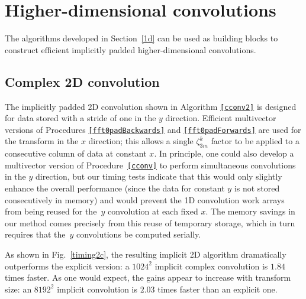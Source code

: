 \documentclass[final]{siamltex}
\begin{document}
\section{Higher-dimensional convolutions}\label{multid}
The algorithms developed in Section~\ref{1d} can be used as building
blocks to construct efficient implicitly padded higher-dimensional convolutions.
\subsection{Complex 2D convolution}
The implicitly padded 2D convolution shown in Algorithm {\tt\ref{cconv2}} 
is designed for data stored with a stride of one in the $y$
direction. Efficient multivector versions of Procedures {\tt\ref{fft0padBackwards}}
and {\tt\ref{fft0padForwards}} are used for the transform in the $x$ direction;
this allows a single $\zeta_{3m}^k$ factor to be applied to a consecutive
column of data at constant $x$. In principle, one could also develop a
multivector version of Procedure~{\tt\ref{cconv}} to perform simultaneous
convolutions in the $y$ direction, but our timing tests indicate that this
would only slightly enhance the overall performance (since the data for constant
$y$ is not stored consecutively in memory) and would prevent the 1D convolution
work arrays from being reused for the~$y$ convolution at each fixed $x$. The
memory savings in our method comes precisely from this reuse of temporary
storage, which in turn requires that the~$y$ convolutions be computed
serially.

As shown in Fig.~\ref{timing2c}, the resulting implicit
2D algorithm dramatically outperforms the explicit version:
a $1024^2$ implicit complex convolution is $1.84$ times faster.
As one would expect, the gains appear to increase with transform size: an
$8192^2$ implicit convolution is $2.03$ times faster than an explicit one. 
\end{document}
